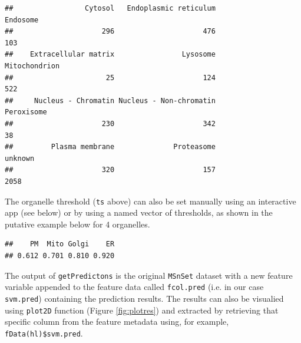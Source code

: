 \begin{knitrout}
\begin{kframe}
\begin{verbatim}
##                 Cytosol   Endoplasmic reticulum                Endosome 
##                     296                     476                     103 
##    Extracellular matrix                Lysosome           Mitochondrion 
##                      25                     124                     522 
##     Nucleus - Chromatin Nucleus - Non-chromatin              Peroxisome 
##                     230                     342                      38 
##         Plasma membrane              Proteasome                 unknown 
##                     320                     157                    2058
\end{verbatim}
\end{kframe}
\end{knitrout}

The organelle threshold (\texttt{ts} above) can also be set manually
using an interactive app (see below) or by using a named vector of
thresholds, as shown in the putative example below for 4 organelles.

\begin{knitrout}
\color{fgcolor}\begin{kframe}
\begin{alltt}
 \hlkwb{<-} \hlstd{(}\hlstd{(}\hlstd{,} \hlstd{,} \hlstd{,} \hlstd{),} \hlstd{(}\hlstd{,} \hlstd{,} \hlstd{,} \hlstd{)))}
\end{alltt}
\begin{verbatim}
##    PM  Mito Golgi    ER 
## 0.612 0.701 0.810 0.920
\end{verbatim}
\end{kframe}
\end{knitrout}

The output of \texttt{getPredictons} is the original \texttt{MSnSet}
dataset with a new feature variable appended to the feature data
called \texttt{fcol.pred} (i.e. in our case \texttt{svm.pred})
containing the prediction results. The results can also be visualied
using \texttt{plot2D} function (Figure \ref{fig:plotres}) and
extracted by retrieving that specific column from the feature metadata
using, for example, \texttt{fData(hl)\$svm.pred}.



